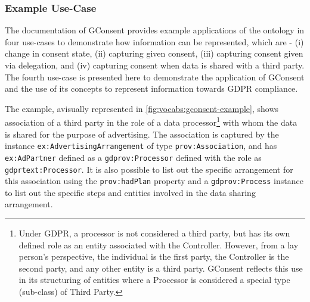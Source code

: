 \subsubsection{Example Use-Case}
The documentation of GConsent provides example applications of the ontology in four use-cases to demonstrate how information can be represented, which are - (i) change in consent state, (ii) capturing given consent, (iii) capturing consent given via delegation, and (iv) capturing consent when data is shared with a third party.
The fourth use-case is presented here to demonstrate the application of GConsent and the use of its concepts to represent information towards GDPR compliance.

The example, avisually represented in \autoref{fig:vocabs:gconsent-example}, shows association of a third party in the role of a data processor\footnote{Under GDPR, a processor is not considered a third party, but has its own defined role as an entity associated with the Controller. However, from a lay person's perspective, the individual is the first party, the Controller is the second party, and any other entity is a third party. GConsent reflects this use in its structuring of entities where a Processor is considered a special type (sub-class) of Third Party.}
with whom the data is shared for the purpose of advertising. The association is captured by the instance \texttt{ex:AdvertisingArrangement} of type \texttt{prov:Association}, and has \texttt{ex:AdPartner} defined as a \texttt{gdprov:Processor} defined with the role as \texttt{gdprtext:Processor}. It is also possible to list out the specific arrangement for this association using the \texttt{prov:hadPlan} property and a \texttt{gdprov:Process} instance to list out the specific steps and entities involved in the data sharing arrangement.

